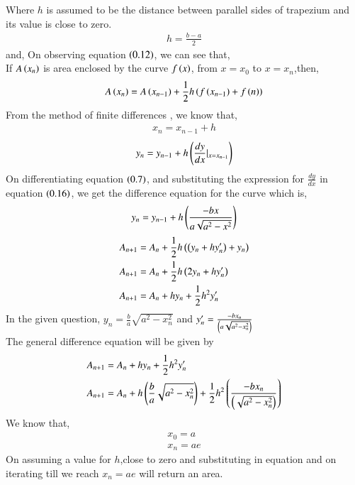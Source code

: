 \documentclass[journal]{IEEEtran}
\begin{document}
Where $h$ is assumed to be the distance between parallel sides of trapezium and its value is close to zero.
\begin{align}
    h = \frac{b - a}{2}
\end{align}
and,
On observing equation $\left(0.12\right)$, we can see that,\\
If $A\left(x_n\right)$ is area enclosed by the curve $f\left(x\right)$, from $x=x_0$ to $x=x_n$,then,
\begin{align}
    A\left(x_n\right) = A\left(x_{n-1}\right) + \frac{1}{2}h\left(f\left(x_{n-1}\right) + f\left(n\right)\right)
\end{align}
From the method of finite differences , we know that,
\begin{align}
    x_n = x_{n-1} + h
\end{align}
\begin{align}
    y_{n} = y_{n-1} + h\left(\frac{dy}{dx}|_{x=x_{n-1}}\right)
\end{align}
On differentiating equation $\left(0.7\right)$, and substituting the expression for $\frac{dy}{dx}$ in equation $\left(0.16\right)$, we get the difference equation for the curve which is,
\begin{align}
     y_{n} = y_{n-1} + h\left(\frac{-bx}{a\sqrt{a^2 - x^2}}\right)
\end{align}
\begin{align}
  A_{n+1}&=A_n+\frac{1}{2}h\left(\left(y_{n}+hy^{\prime}_n\right)+y_n\right)\\
  A_{n+1}&=A_n+\frac{1}{2}h\left(2y_n+hy^{\prime}_n\right)\\
  A_{n+1}&=A_n+hy_n+\frac{1}{2}h^2y^{\prime}_n\\
\end{align}
In the given question, $y_n=\frac{b}{a}\sqrt{a^2-x_n^2}$ and $y^{\prime}_n= \frac{-bx_n}{\left(a\sqrt{a^2-x_n^2}\right)}$\\
The general difference equation will be given by
\begin{align}
  A_{n+1}&=A_n+hy_n+\frac{1}{2}h^2y^{\prime}_n\\
  A_{n+1}&=A_n+h\left(\frac{b}{a}\sqrt{a^2-x_n^2}\right)+\frac{1}{2}h^2\left(\frac{-bx_n}{\left(\sqrt{a^2-x_n^2}\right)}\right)\\
\end{align}
We know that,
\begin{align}
    x_0 = a\\
    x_n = ae
\end{align}
On assuming a value for $h$,close to zero and substituting in equation and on iterating till we reach $x_n=ae$ will return an area.\\
\end{document}
